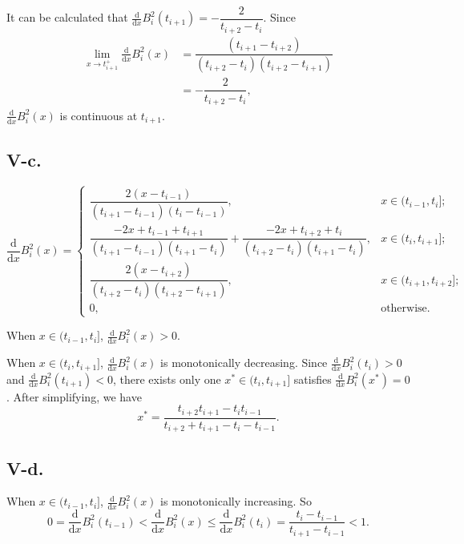 \documentclass[a4paper]{article}
\begin{document}
It can be calculated that $\frac{\mathrm{d}}{\mathrm{d}x}B_i^2(t_{i+1})=-\dfrac{2}{t_{i+2}-t_{i}}$. Since
$$
\begin{aligned}
  \lim_{x\rightarrow t_{i+1}^+} \frac{\mathrm{d}}{\mathrm{d}x}B_i^2(x)&=\dfrac{(t_{i+1}-t_{i+2})}{(t_{i+2}-t_{i})(t_{i+2}-t_{i+1})}\\
  &=-\dfrac{2}{t_{i+2}-t_{i}},
\end{aligned}
$$
$\frac{\mathrm{d}}{\mathrm{d}x}B_i^2(x)$ is continuous at $t_{i+1}$.

\subsection*{V-c.}
$$
\frac{\mathrm{d}}{\mathrm{d}x}B_i^2(x)=\begin{cases}
  \dfrac{2(x-t_{i-1})}{(t_{i+1}-t_{i-1})(t_i-t_{i-1})},&x\in(t_{i-1},t_i];\\
  \dfrac{-2x+t_{i-1}+t_{i+1}}{(t_{i+1}-t_{i-1})(t_{i+1}-t_i)}+\dfrac{-2x+t_{i+2}+t_i}{(t_{i+2}-t_i)(t_{i+1}-t_i)},&x\in(t_i,t_{i+1}];\\
  \dfrac{2(x-t_{i+2})}{(t_{i+2}-t_i)(t_{i+2}-t_{i+1})},&x\in(t_{i+1},t_{i+2}];\\
  0,&\text{otherwise.}
\end{cases}
$$

When $x\in (t_{i-1},t_{i}]$, $\frac{\mathrm{d}}{\mathrm{d}x}B_i^2(x)>0$.

When $x\in (t_{i},t_{i+1}]$, $\frac{\mathrm{d}}{\mathrm{d}x}B_i^2(x)$ is monotonically decreasing. Since $\frac{\mathrm{d}}{\mathrm{d}x}B_i^2(t_i)>0$ and $\frac{\mathrm{d}}{\mathrm{d}x}B_i^2(t_{i+1})<0$, 
there exists only one $x^{*}\in (t_{i},t_{i+1}]$ satisfies $\frac{\mathrm{d}}{\mathrm{d}x}B_i^2(x^{*})=0$. After simplifying, we have 
$$
x^{*}=\dfrac{t_{i+2}t_{i+1}-t_{i}t_{i-1}}{t_{i+2}+t_{i+1}-t_{i}-t_{i-1}}.
$$

\subsection*{V-d.}
When $x\in (t_{i-1},t_{i}]$, $\frac{\mathrm{d}}{\mathrm{d}x}B_i^2(x)$ is monotonically increasing. So 
$$0=\frac{\mathrm{d}}{\mathrm{d}x}B_i^2(t_{i-1})<\frac{\mathrm{d}}{\mathrm{d}x}B_i^2(x)\leq \frac{\mathrm{d}}{\mathrm{d}x}B_i^2(t_i)=\dfrac{t_i-t_{i-1}}{t_{i+1}-t_{i-1}}<1.$$
\end{document}
